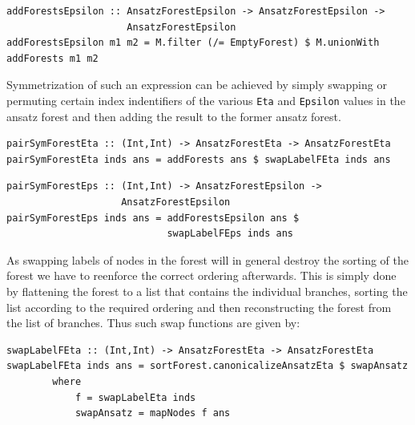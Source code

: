 \documentclass[a4paper,12pt, DIV=14, BCOR=5mm, twoside, headsepline]{scrbook}
\begin{document}
\begin{samepage}
\begin{verbatim}
addForestsEpsilon :: AnsatzForestEpsilon -> AnsatzForestEpsilon ->
                     AnsatzForestEpsilon
addForestsEpsilon m1 m2 = M.filter (/= EmptyForest) $ M.unionWith
addForests m1 m2
\end{verbatim} 
\end{samepage}
Symmetrization of such an expression can be achieved by simply swapping or permuting certain index indentifiers of the various \texttt{Eta} and \texttt{Epsilon} values in the ansatz forest and then adding the result to the former ansatz forest.
\begin{samepage} 
\begin{verbatim}
pairSymForestEta :: (Int,Int) -> AnsatzForestEta -> AnsatzForestEta
pairSymForestEta inds ans = addForests ans $ swapLabelFEta inds ans
\end{verbatim} 
\end{samepage}

\begin{samepage}
\begin{verbatim}
pairSymForestEps :: (Int,Int) -> AnsatzForestEpsilon ->
                    AnsatzForestEpsilon
pairSymForestEps inds ans = addForestsEpsilon ans $ 
                            swapLabelFEps inds ans
\end{verbatim} 
\end{samepage}

As swapping labels of nodes in the forest will in general destroy the sorting of the forest we have to reenforce the correct ordering afterwards. This is simply done by flattening the forest to a list that contains the individual branches, sorting the list according to the required ordering and then reconstructing the forest from the list of branches. Thus such swap functions are given by:

\begin{samepage} 
\begin{verbatim}
swapLabelFEta :: (Int,Int) -> AnsatzForestEta -> AnsatzForestEta
swapLabelFEta inds ans = sortForest.canonicalizeAnsatzEta $ swapAnsatz
        where
            f = swapLabelEta inds
            swapAnsatz = mapNodes f ans
\end{verbatim} 
\end{samepage}
\end{document}
